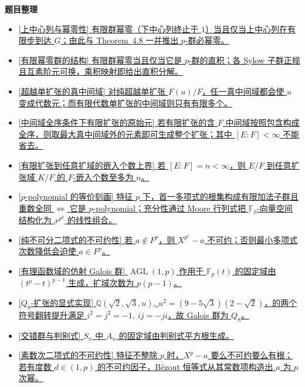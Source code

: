 \documentclass[a4paper]{ctexart}
\theoremstyle{definition}
\theoremstyle{analysis}
\theoremstyle{plain}
\begin{document}
\vspace{0.8em}
\noindent\textbf{题目整理}

\begin{itemize}
  \item \hyperref[subsec:problem-upper-central-nilpotent]{[上中心列与幂零性] 有限群幂零（下中心列终止于 \(1\)）当且仅当上中心列在有限步到达 \(G\)；由此与 Theorem~4.8 一并推出 \(p\)-群必幂零。}
  \item \hyperref[subsec:problem-nilpotent-p-product]{[有限幂零群的结构] 有限群幂零当且仅当它是 \(p\)-群的直积；各 Sylow 子群正规且互素阶元可换，乘积映射即给出直积分解。}
  \item \hyperref[subsec:problem-transcendental-simple]{[超越单扩张的真中间域] 对纯超越单扩张 \(F(u)/F\)，任一真中间域都会使 \(u\) 变成代数元；而有限代数单扩张的中间域则只有有限多个。}
  \item \hyperref[subsec:problem-primitive-element-chain]{[中间域全序条件下有限扩张的原始元] 若有限扩张的含 \(F\) 中间域按照包含构成全序，则取最大真中间域外的元素即可生成整个扩张；其中 \([E:F]<\infty\) 不能省去。}
  \item \hyperref[subsec:problem-finite-extension-monomorphism-count]{[有限扩张到任意扩域的嵌入个数上界] 若 \([E:F]=n<\infty\)，则 \(E/F\) 到任意扩张域 \(K/F\) 的 \(F\)-嵌入个数至多为 \(n\)。}
  \item \hyperref[subsec:problem-p-polynomial]{[\(p\)-polynomial 的等价刻画] 特征 \(p\) 下，首一多项式的根集构成有限加法子群且重数全同 \(\iff\) 它是 \(p\)-polynomial；充分性通过 Moore 行列式把 \(\mathbb F_p\)-向量空间结构化为 \(x^{p^k}\) 的线性组合。}
  \item \hyperref[subsec:problem-purely-inseparable-binomial]{[纯不可分二项式的不可约性] 若 \(a\notin F^p\)，则 \(X^{p^e}-a\) 不可约；否则最小多项式次数降低会迫使 \(a\in F^p\)。}
  \item \hyperref[subsec:problem-affine-galois]{[有理函数域的仿射 Galois 群] \(\operatorname{AGL}(1,p)\) 作用于 \(\mathbb F_p(t)\) 的固定域由 \((t^p-t)^{p-1}\) 生成，扩域次数为 \(p(p-1)\)。}
  \item \hyperref[subsec:problem-quartic-normal]{[\(Q_8\)-扩张的显式实现] \(\mathbb Q(\sqrt2,\sqrt3,u)\), \(u^2=(9-5\sqrt3)(2-\sqrt2)\)，的两个符号翻转提升满足 \(i^2=j^2=-1,\ ij=-ji\)，故 Galois 群为 \(Q_8\)。}
  \item \hyperref[subsec:problem-alternating-discriminant]{[交错群与判别式] \(S_n\) 中 \(A_n\) 的固定域由判别式平方根生成。}
  \item \hyperref[subsec:problem-prime-binomial-irreducible]{[素数次二项式的不可约性] 特征不整除 \(p\) 时，\(X^p-a\) 要么不可约要么有根；若有度数 \(d\in(1,p)\) 的不可约因子，Bézout 恒等式从其常数项构造出 \(a\) 为 \(p\) 次幂。}

\end{itemize}
\end{document}
